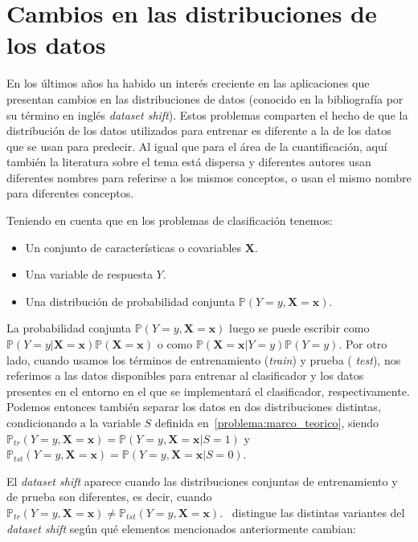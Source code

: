 \section{Cambios en las distribuciones de los datos}\label{problema:cambios}

En los últimos años ha habido un interés creciente en las aplicaciones que
presentan cambios en las distribuciones de datos (conocido en la bibliografía
por su término en inglés {\it dataset shift\/}). Estos problemas comparten el
hecho de que la distribución de los datos utilizados para entrenar es diferente
a la de los datos que se usan para predecir. Al igual que para el área de la
cuantificación, aquí también la literatura sobre el tema está dispersa y
diferentes autores usan diferentes nombres para referirse a los mismos
conceptos, o usan el mismo nombre para diferentes conceptos.

Teniendo en cuenta que en los problemas de clasificación tenemos:

\begin{itemize}
    \item Un conjunto de características o covariables $\boldsymbol{X}$.
    \item Una variable de respuesta $Y$.
    \item Una distribución de probabilidad conjunta
    $\mathbb{P}(Y=y,\boldsymbol{X=x})$.
\end{itemize}

La probabilidad conjunta $\mathbb{P}(Y=y,\boldsymbol{X}=\boldsymbol{x})$ luego
se puede escribir como
$\mathbb{P}(Y=y|\boldsymbol{X}=\boldsymbol{x})\mathbb{P}(\boldsymbol{X}=\boldsymbol{x})$
o como $\mathbb{P}(\boldsymbol{X}=\boldsymbol{x}|Y=y)\mathbb{P}(Y=y)$. Por otro
lado, cuando usamos los términos de entrenamiento ({\it train\/}) y prueba ({\it
test\/}), nos referimos a las datos disponibles para entrenar al clasificador y
los datos presentes en el entorno en el que se implementará el clasificador,
respectivamente. Podemos entonces también separar los datos en dos
distribuciones distintas, condicionando a la variable $S$ definida
en~\ref{problema:marco_teorico}, siendo
$\mathbb{P}_{tr}(Y=y,\boldsymbol{X}=\boldsymbol{x})=\mathbb{P}(Y=y,\boldsymbol{X}=\boldsymbol{x}|S=1)$
y
$\mathbb{P}_{tst}(Y=y,\boldsymbol{X}=\boldsymbol{x})=\mathbb{P}(Y=y,\boldsymbol{X}=\boldsymbol{x}|S=0)$.

El {\it dataset shift\/} aparece cuando las distribuciones conjuntas de
entrenamiento y de prueba son diferentes, es decir, cuando
$\mathbb{P}_{tr}(Y=y,\boldsymbol{X}=\boldsymbol{x}) \neq
\mathbb{P}_{tst}(Y=y,\boldsymbol{X}=\boldsymbol{x})$.~\citet{moreno2012unifying}
distingue las distintas variantes del {\it dataset shift\/} según qué elementos
mencionados anteriormente cambian:

